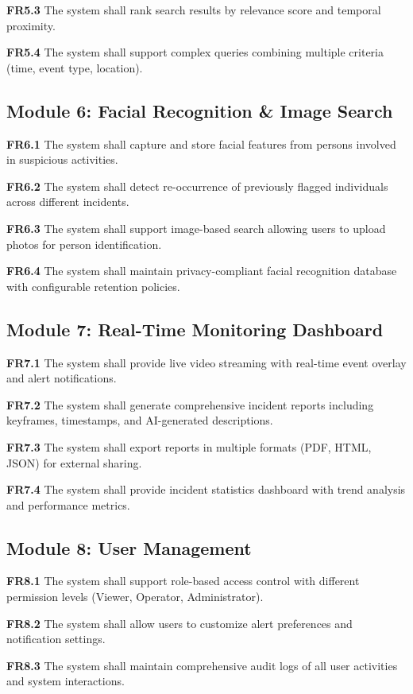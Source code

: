 \documentclass[12pt,a4paper]{article}
\begin{document}
\textbf{FR5.3} The system shall rank search results by relevance score and temporal proximity.

\textbf{FR5.4} The system shall support complex queries combining multiple criteria (time, event type, location).

\subsection{Module 6: Facial Recognition \& Image Search}
\textbf{FR6.1} The system shall capture and store facial features from persons involved in suspicious activities.

\textbf{FR6.2} The system shall detect re-occurrence of previously flagged individuals across different incidents.

\textbf{FR6.3} The system shall support image-based search allowing users to upload photos for person identification.

\textbf{FR6.4} The system shall maintain privacy-compliant facial recognition database with configurable retention policies.

\subsection{Module 7: Real-Time Monitoring Dashboard}
\textbf{FR7.1} The system shall provide live video streaming with real-time event overlay and alert notifications.

\textbf{FR7.2} The system shall generate comprehensive incident reports including keyframes, timestamps, and AI-generated descriptions.

\textbf{FR7.3} The system shall export reports in multiple formats (PDF, HTML, JSON) for external sharing.

\textbf{FR7.4} The system shall provide incident statistics dashboard with trend analysis and performance metrics.

\subsection{Module 8: User Management}
\textbf{FR8.1} The system shall support role-based access control with different permission levels (Viewer, Operator, Administrator).

\textbf{FR8.2} The system shall allow users to customize alert preferences and notification settings.

\textbf{FR8.3} The system shall maintain comprehensive audit logs of all user activities and system interactions.
\end{document}

